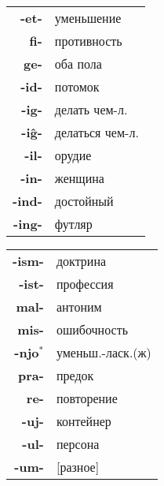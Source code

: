 \documentclass{article}
\begin{document}
\hspace{-1em}
\begin{tabular}{>{\bfseries}rl}
\hline
-et- & уменьшение \\
fi- & противность \\
ge- & оба пола \\
-id- & потомок \\
-ig- & делать чем-л. \\
-iĝ- & делаться чем-л. \\
-il- & орудие \\
-in- & женщина \\
-ind- & достойный \\
-ing- & футляр \\
\hline
\end{tabular}
\hspace{-1em}
\begin{tabular}{>{\bfseries}rl|}
\hline
-ism- & доктрина \\
-ist- & профессия \\
mal- & антоним \\
mis- & ошибочность \\
-njo$^*$ & уменьш.-ласк.(ж) \\
pra- & предок \\
re- & повторение \\
-uj- & контейнер \\
-ul- & персона \\
-um- & [разное] \\
\hline
\end{tabular}
\end{document}
